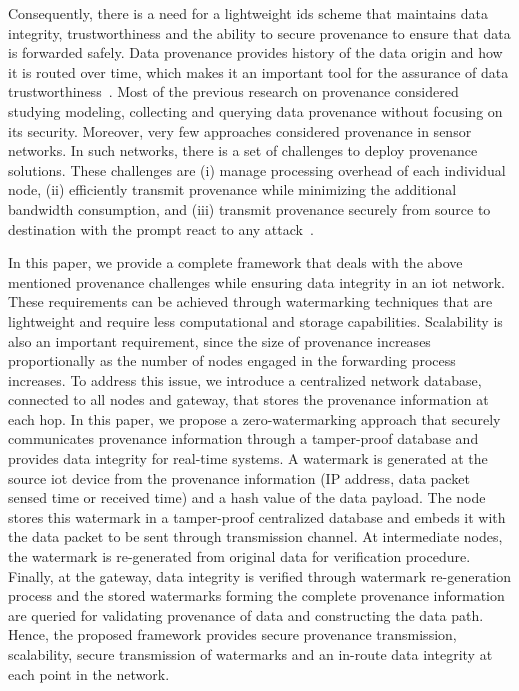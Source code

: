 \documentclass{llncs}
\begin{document}
Consequently, there is a need for a lightweight \gls*{ids} scheme that maintains data integrity, trustworthiness and the ability to secure provenance to ensure that data is forwarded safely. Data provenance provides history of the data origin and how it is routed over time, which makes it an important tool for the assurance of data trustworthiness~\cite{Sultana2013,Dai2008}. Most of the previous research on provenance considered studying modeling, collecting and querying data provenance without focusing on its security. Moreover, very few approaches considered provenance in sensor networks. In such networks, there is a set of challenges to deploy provenance solutions. These challenges are (i) manage processing overhead of each individual node, (ii) efficiently transmit provenance while minimizing the additional bandwidth consumption, and (iii) transmit provenance securely from source to destination with the prompt react to any attack~\cite{Sultana2013}. 

In this paper, we provide a complete framework that deals with the above mentioned provenance challenges while ensuring data integrity in an \gls*{iot} network. These requirements can be achieved through watermarking techniques that are lightweight and require less computational and storage capabilities. Scalability is also an important requirement, since the size of provenance increases proportionally as the number of nodes engaged in the forwarding process increases. To address this issue, we introduce a centralized network database, connected to all nodes and gateway, that stores the provenance information at each hop. In this paper, we propose a zero-watermarking approach that securely communicates provenance information through a tamper-proof database and provides data integrity for real-time systems. A watermark is generated at the source \gls*{iot} device from the provenance information (IP address, data packet sensed time or received time) and a hash value of the data payload. The node stores this watermark in a tamper-proof centralized database and embeds it with the data packet to be sent through transmission channel. At intermediate nodes, the watermark is re-generated from original data for verification procedure. Finally, at the gateway, data integrity is verified through watermark re-generation process and the stored watermarks forming the complete provenance information are queried for validating provenance of data and constructing the data path. Hence, the proposed framework provides secure provenance transmission, scalability, secure transmission of watermarks and an in-route data integrity at each point in the network. 
\end{document}
